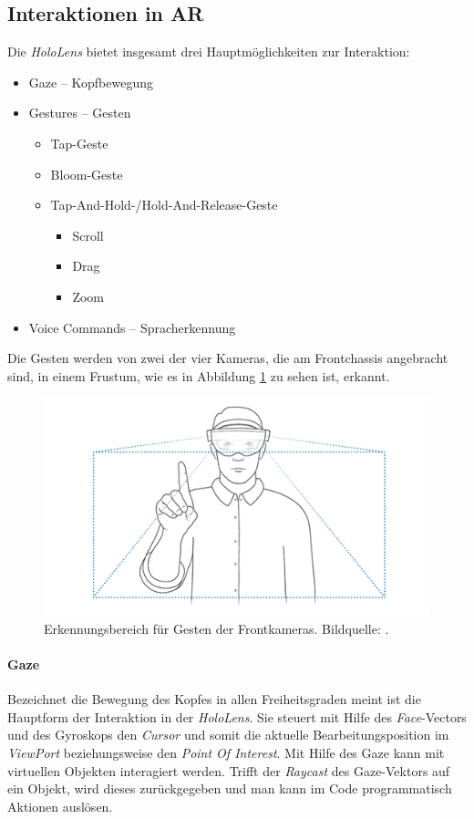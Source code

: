 \subsection{Interaktionen in AR}\label{ssec:arInteraction}
Die \textit{HoloLens} bietet insgesamt drei Hauptmöglichkeiten zur Interaktion:
\begin{itemize}
	\item Gaze -- Kopfbewegung
	\item Gestures -- Gesten
	\begin{itemize}
		\item Tap-Geste
		\item Bloom-Geste
		\item Tap-And-Hold-/Hold-And-Release-Geste
		\begin{itemize}
			\item Scroll
			\item Drag
			\item Zoom
		\end{itemize}
	\end{itemize}
	\item Voice Commands -- Spracherkennung
\end{itemize}
Die Gesten werden von zwei der vier Kameras, die am Frontchassis angebracht sind, in einem Frustum, wie es in Abbildung \ref{fig:gesture_frustum} zu sehen ist, erkannt.
\begin{figure}[H]
	\centering
	\includegraphics[width=1.0\textwidth]{figuren/gesture_frustum}
	\caption{Erkennungsbereich für Gesten der Frontkameras. Bildquelle: \cite{gestureFrustum}.}
	\label{fig:gesture_frustum}
\end{figure}
\paragraph*{Gaze} Bezeichnet die Bewegung des Kopfes in allen Freiheitsgraden meint ist die Hauptform der Interaktion in der \textit{HoloLens}. Sie steuert mit Hilfe des \textit{Face}-Vectors und des Gyroskops den \textit{Cursor} und somit die aktuelle Bearbeitungsposition im \textit{ViewPort} beziehungsweise den \textit{Point Of Interest}. Mit Hilfe des Gaze kann mit virtuellen Objekten interagiert werden. Trifft der \textit{Raycast} des Gaze-Vektors auf ein Objekt, wird dieses zurückgegeben und man kann im Code programmatisch Aktionen auslösen.

